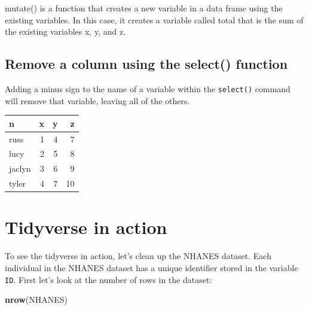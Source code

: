 \documentclass[12pt,]{book}
\newenvironment{Shaded}{\begin{snugshade}}{\end{snugshade}}
\newcommand{\KeywordTok}[1]{\textcolor[rgb]{0.13,0.29,0.53}{\textbf{#1}}}
\newcommand{\NormalTok}[1]{#1}
\newcommand{\OperatorTok}[1]{\textcolor[rgb]{0.81,0.36,0.00}{\textbf{#1}}}
\newcommand{\StringTok}[1]{\textcolor[rgb]{0.31,0.60,0.02}{#1}}
\begin{document}
mutate() is a function that creates a new variable in a data frame using the existing variables. In this case, it creates a variable called total that is the sum of the existing variables x, y, and z.

\hypertarget{remove-a-column-using-the-select-function}{%
\subsection{Remove a column using the select() function}\label{remove-a-column-using-the-select-function}}

Adding a minus sign to the name of a variable within the \texttt{select()} command will remove that variable, leaving all of the others.

\begin{Shaded}
\end{Shaded}

\begin{tabular}{l|r|r|r}
\hline
n & x & y & z\\
\hline
russ & 1 & 4 & 7\\
\hline
lucy & 2 & 5 & 8\\
\hline
jaclyn & 3 & 6 & 9\\
\hline
tyler & 4 & 7 & 10\\
\hline
\end{tabular}

\hypertarget{tidyverse-in-action}{%
\section{Tidyverse in action}\label{tidyverse-in-action}}

To see the tidyverse in action, let's clean up the NHANES dataset. Each individual in the NHANES dataset has a unique identifier stored in the variable \texttt{ID}. First let's look at the number of rows in the dataset:

\begin{Shaded}
\begin{Highlighting}[]
\KeywordTok{nrow}\NormalTok{(NHANES)}
\end{Highlighting}
\end{Shaded}
\end{document}

